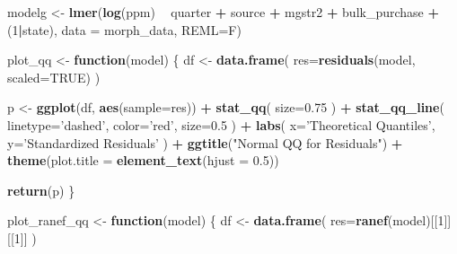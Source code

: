 \documentclass[
  11pt,
]{article}
\newenvironment{Shaded}{\begin{snugshade}}{\end{snugshade}}
\newcommand{\ControlFlowTok}[1]{\textcolor[rgb]{0.13,0.29,0.53}{\textbf{#1}}}
\newcommand{\DataTypeTok}[1]{\textcolor[rgb]{0.13,0.29,0.53}{#1}}
\newcommand{\DecValTok}[1]{\textcolor[rgb]{0.00,0.00,0.81}{#1}}
\newcommand{\FloatTok}[1]{\textcolor[rgb]{0.00,0.00,0.81}{#1}}
\newcommand{\KeywordTok}[1]{\textcolor[rgb]{0.13,0.29,0.53}{\textbf{#1}}}
\newcommand{\NormalTok}[1]{#1}
\newcommand{\OperatorTok}[1]{\textcolor[rgb]{0.81,0.36,0.00}{\textbf{#1}}}
\newcommand{\OtherTok}[1]{\textcolor[rgb]{0.56,0.35,0.01}{#1}}
\newcommand{\StringTok}[1]{\textcolor[rgb]{0.31,0.60,0.02}{#1}}
\begin{document}
\begin{Shaded}
\begin{Highlighting}[]
\NormalTok{modelg <-}\StringTok{ }\KeywordTok{lmer}\NormalTok{(}\KeywordTok{log}\NormalTok{(ppm) }\OperatorTok{~}\StringTok{  }\NormalTok{quarter }\OperatorTok{+}\StringTok{ }\NormalTok{source }\OperatorTok{+}\StringTok{ }\NormalTok{mgstr2 }\OperatorTok{+}\StringTok{ }\NormalTok{bulk_purchase }\OperatorTok{+}\StringTok{ }
\StringTok{                 }\NormalTok{(}\DecValTok{1}\OperatorTok{|}\NormalTok{state), }\DataTypeTok{data =}\NormalTok{ morph_data, }\DataTypeTok{REML=}\NormalTok{F)}
\end{Highlighting}
\end{Shaded}

\begin{Shaded}
\begin{Highlighting}[]
\NormalTok{plot_qq <-}\StringTok{ }\ControlFlowTok{function}\NormalTok{(model) \{}
\NormalTok{  df <-}\StringTok{ }\KeywordTok{data.frame}\NormalTok{(}
    \DataTypeTok{res=}\KeywordTok{residuals}\NormalTok{(model, }\DataTypeTok{scaled=}\OtherTok{TRUE}\NormalTok{)}
\NormalTok{  )}
  
\NormalTok{  p <-}\StringTok{ }\KeywordTok{ggplot}\NormalTok{(df, }\KeywordTok{aes}\NormalTok{(}\DataTypeTok{sample=}\NormalTok{res)) }\OperatorTok{+}\StringTok{ }
\StringTok{    }\KeywordTok{stat_qq}\NormalTok{(}
      \DataTypeTok{size=}\FloatTok{0.75}
\NormalTok{    ) }\OperatorTok{+}\StringTok{ }
\StringTok{    }\KeywordTok{stat_qq_line}\NormalTok{(}
      \DataTypeTok{linetype=}\StringTok{'dashed'}\NormalTok{,}
      \DataTypeTok{color=}\StringTok{'red'}\NormalTok{,}
      \DataTypeTok{size=}\FloatTok{0.5}
\NormalTok{    ) }\OperatorTok{+}
\StringTok{    }\KeywordTok{labs}\NormalTok{(}
      \DataTypeTok{x=}\StringTok{'Theoretical Quantiles'}\NormalTok{,}
      \DataTypeTok{y=}\StringTok{'Standardized Residuals'}
\NormalTok{    ) }\OperatorTok{+}\StringTok{ }
\StringTok{    }\KeywordTok{ggtitle}\NormalTok{(}\StringTok{"Normal QQ for Residuals"}\NormalTok{) }\OperatorTok{+}
\StringTok{    }\KeywordTok{theme}\NormalTok{(}\DataTypeTok{plot.title =} \KeywordTok{element_text}\NormalTok{(}\DataTypeTok{hjust =} \FloatTok{0.5}\NormalTok{))}
  
  \KeywordTok{return}\NormalTok{(p)}
\NormalTok{\}}


\NormalTok{plot_ranef_qq <-}\StringTok{ }\ControlFlowTok{function}\NormalTok{(model) \{}
\NormalTok{  df <-}\StringTok{ }\KeywordTok{data.frame}\NormalTok{(}
    \DataTypeTok{res=}\KeywordTok{ranef}\NormalTok{(model)[[}\DecValTok{1}\NormalTok{]][[}\DecValTok{1}\NormalTok{]]}
\NormalTok{  )}
  

\end{Highlighting}
\end{Shaded}
\end{document}
